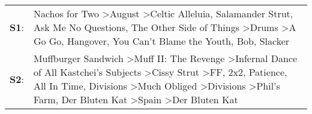 \begin{supertabular}{p{0.03\textwidth}p{0.92\textwidth}}
 \textbf{S1}:  &                                                                                                                                                                                             Nachos for Two\textsuperscript{} \textgreater \enspace August\textsuperscript{} \textgreater \enspace Celtic Alleluia\textsuperscript{}, \enspace Salamander Strut\textsuperscript{}, \enspace Ask Me No Questions\textsuperscript{}, \enspace The Other Side of Things\textsuperscript{} \textgreater \enspace Drums\textsuperscript{} \textgreater \enspace A Go Go\textsuperscript{}, \enspace Hangover\textsuperscript{}, \enspace You Can't Blame the Youth\textsuperscript{}, \enspace Bob\textsuperscript{}, \enspace Slacker\textsuperscript{}  \enspace  \\
 \textbf{S2}:  &  Muffburger Sandwich\textsuperscript{} \textgreater \enspace Muff II: The Revenge\textsuperscript{} \textgreater \enspace Infernal Dance of All Kastchei's Subjects\textsuperscript{} \textgreater \enspace Cissy Strut\textsuperscript{} \textgreater \enspace FF\textsuperscript{}, \enspace 2x2\textsuperscript{}, \enspace Patience\textsuperscript{}, \enspace All In Time\textsuperscript{}, \enspace Divisions\textsuperscript{} \textgreater \enspace Much Obliged\textsuperscript{} \textgreater \enspace Divisions\textsuperscript{} \textgreater \enspace Phil's Farm\textsuperscript{}, \enspace Der Bluten Kat\textsuperscript{} \textgreater \enspace Spain\textsuperscript{} \textgreater \enspace Der Bluten Kat\textsuperscript{}  \enspace  \\
\end{supertabular}
